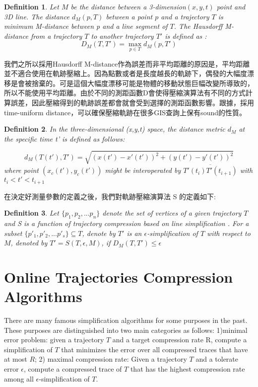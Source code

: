 \documentclass[12pt]{article}
\newtheorem{mydef}{Definition}
\begin{document}
\begin{CJK}{UTF8}{bsmi}
\begin{mydef}
Let $M$ be the distance between a 3-dimension$(x,y,t)$ point and 3D line. The distance $d_M(p,T)$ between a point $p$ and a trajectory $T$ is minimum M-distance between p and a line segment of $T$. The Hausdorff M-distance from a trajectory $T$ to another trajectory $T'$ is defined as :
\[ D_M(T,T') = \max_{p\in T} d_M(p,T') \]
\end{mydef}


我們之所以採用Hausdorff M-distance作為誤差而非平均距離的原因是，平均距離並不適合使用在軌跡壓縮上。因為點數或者是長度越長的軌跡下，偶發的大幅度漂移是會被捨棄的。可是這個大幅度漂移可能是物體的移動狀態巨幅改變所導致的，所以不能使用平均距離。由於不同的測距函數D會使得壓縮演算法有不同的方式計算誤差，因此壓縮得到的軌跡誤差都會就會受到選擇的測距函數影響。跟據\cite{2006:Cao}，採用 time-uniform distance，可以確保壓縮軌跡在很多GIS查詢上保有sound的性質。\\


\begin{mydef}
In the three-dimensional (x,y,t) space, the distance metric $d_M$ at the specific time t' is defined as  follows:

\[ d_M(T(t'),T') = \sqrt{(x(t')-x'(t'))^2+(y(t')-y'(t'))^2} \]
where point $(x_c(t'),y_c(t'))$ might be interoperated by  $\overline{T'(t_i)T'(t_{i+1})}$ with $t_i < t' <t_{i+1}$

\end{mydef}


在決定好測量參數的定義之後，我們對軌跡壓縮演算法 S 的定義如下:

\begin{mydef}
Let $\{p_1,p_2,...p_n\}$ denote the set of vertices of a given trajectory $T$ and S is a function of trajectory compression based on line simplification . For a subset $\{p'_1,p'_2,...p'_s\} \subseteq T$, denote by $T'$ is an  $\epsilon$-simplification of $T$ with respect to $M$, denoted by $T'= S(T,\epsilon,M)$, if $D_M(T,T')\leq \epsilon $

\end{mydef}





\section{Online Trajectories Compression Algorithms}

There are many famous simplification algorithms for some purposes in the past. These purposes are distinguished into two main categories as follows: 1)minimal error problem: given a trajectory $T$ and a target compression rate R, compute a simplification of $T$ that minimizes the error over all compressed traces that have at most $R$; 2) maximal compression rate: Given a trajectory $T$ and a tolerate error $\epsilon$, compute a compressed trace of $T$ that has the highest compression rate among all $\epsilon$-simplification of $T$.\\


\end{CJK}
\end{document}
